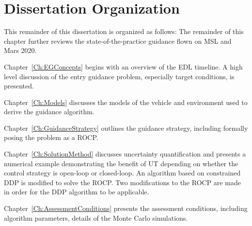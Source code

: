 



\section{Dissertation Organization}
This remainder of this dissertation is organized as follows: The remainder of this chapter further reviews the state-of-the-practice guidance flown on MSL and Mars 2020. 

Chapter~\ref{Ch:EGConcepts} begins with an overview of the EDL timeline. A high level discussion of the entry guidance problem, especially target conditions, is presented.

Chapter~\ref{Ch:Models} discusses the models of the vehicle and environment used to derive the guidance algorithm.

Chapter~\ref{Ch:GuidanceStrategy} outlines the guidance strategy, including formally posing the problem as a ROCP.

Chapter~\ref{Ch:SolutionMethod} discusses uncertainty quantification and presents a numerical example demonstrating the benefit of UT depending on whether the control strategy is open-loop or closed-loop. An algorithm based on constrained DDP is modified to solve the ROCP. Two modifications to the ROCP are made in order for the DDP algorithm to be applicable. 

Chapter~\ref{Ch:AssessmentConditions} presents the assessment conditions, including algorithm parameters, details of the Monte Carlo simulations. 

